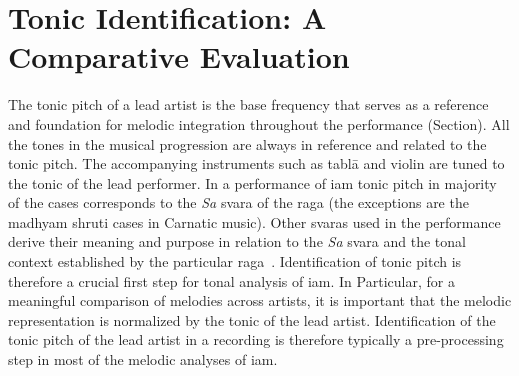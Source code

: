 
\section{Tonic Identification: A Comparative Evaluation}
\label{sec:data_preprocessing_tonic_identification}

The tonic pitch of a lead artist is the base frequency that serves as a reference and foundation for melodic integration throughout the performance (Section). All the tones in the musical progression are always in reference and related to the tonic pitch. The accompanying instruments such as tabl\={a} and violin are tuned to the tonic of the lead performer. In a performance of \gls{iam} tonic pitch in majority of the cases corresponds to the \textit{Sa} \gls{svara} of the \gls{raga} (the exceptions are the madhyam \gls{shruti} cases in Carnatic music). Other \glspl{svara} used in the performance derive their meaning and purpose in relation to the \textit{Sa} \gls{svara} and the tonal context established by the particular \gls{raga}~\citep{Danielou2010}. Identification of tonic pitch is therefore a crucial first step for tonal analysis of \gls{iam}. In Particular, for a meaningful comparison of melodies across artists, it is important that the melodic representation is normalized by the tonic of the lead artist. Identification of the tonic pitch of the lead artist in a recording is therefore typically a pre-processing step in most of the melodic analyses of \gls{iam}. 

